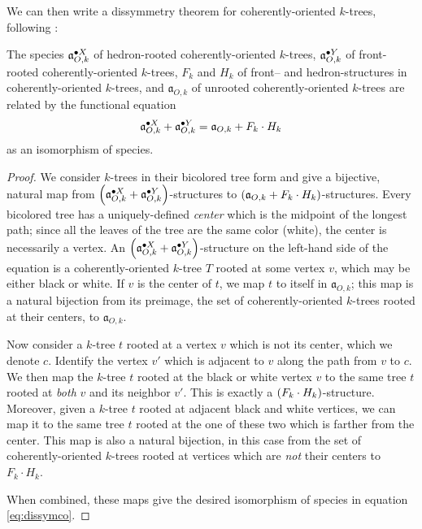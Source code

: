 \documentclass[sectionflow,singlespace,twoside,boldmathhdr]{brandiss} %
\numberwithin{section}{chapter}
\numberwithin{figure}{chapter}
\begin{document}
We can then write a dissymmetry theorem for coherently-oriented $k$-trees, following \cite[\S 3.2, eq.\ (54)]{bll:species}:
\begin{theorem}
  \label{thm:dissymco}
  The species $\pointed[X]{\mathfrak{a}}_{O, k}$ of hedron-rooted coherently-oriented $k$-trees, $\pointed[Y]{\mathfrak{a}}_{O, k}$ of front-rooted coherently-oriented $k$-trees, $F_{k}$ and $H_{k}$ of front-- and hedron-structures in coherently-oriented $k$-trees, and $\mathfrak{a}_{O, k}$ of unrooted coherently-oriented $k$-trees are related by the functional equation
  \begin{equation}
    \label{eq:dissymco}
    \pointed[X]{\mathfrak{a}}_{O, k} + \pointed[Y]{\mathfrak{a}}_{O, k} = \mathfrak{a}_{O, k} + F_{k} \cdot H_{k}
  \end{equation}
  as an isomorphism of species.
\end{theorem}

\begin{proof}
  We consider $k$-trees in their bicolored tree form and give a bijective, natural map from $\pbrac{\pointed[X]{\mathfrak{a}}_{O, k} + \pointed[Y]{\mathfrak{a}}_{O, k}}$-structures to $\pbrac{\mathfrak{a}_{O, k} + F_{k} \cdot H_{k}}$-structures.
  Every bicolored tree has a uniquely-defined \emph{center} which is the midpoint of the longest path; since all the leaves of the tree are the same color (white), the center is necessarily a vertex.
  An $\pbrac{\pointed[X]{\mathfrak{a}}_{O, k} + \pointed[Y]{\mathfrak{a}}_{O, k}}$-structure on the left-hand side of the equation is a coherently-oriented $k$-tree $T$ rooted at some vertex $v$, which may be either black or white.
  If $v$ is the center of $t$, we map $t$ to itself in $\mathfrak{a}_{O, k}$; this map is a natural bijection from its preimage, the set of coherently-oriented $k$-trees rooted at their centers, to $\mathfrak{a}_{O, k}$.

  Now consider a $k$-tree $t$ rooted at a vertex $v$ which is not its center, which we denote $c$.
  Identify the vertex $v'$ which is adjacent to $v$ along the path from $v$ to $c$.
  We then map the $k$-tree $t$ rooted at the black or white vertex $v$ to the same tree $t$ rooted at \emph{both} $v$ and its neighbor $v'$.
  This is exactly a $\pbrac{F_{k} \cdot H_{k}}$-structure.
  Moreover, given a $k$-tree $t$ rooted at adjacent black and white vertices, we can map it to the same tree $t$ rooted at the one of these two which is farther from the center.
  This map is also a natural bijection, in this case from the set of coherently-oriented $k$-trees rooted at vertices which are \emph{not} their centers to $F_{k} \cdot H_{k}$.

  When combined, these maps give the desired isomorphism of species in equation \eqref{eq:dissymco}.
\end{proof}
\end{document}

